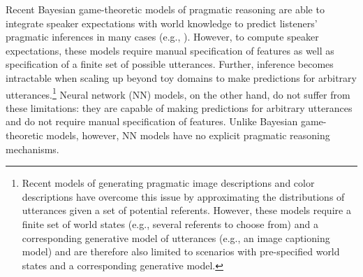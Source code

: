\documentclass[11pt,a4paper]{article}
\begin{document}
Recent Bayesian game-theoretic models of pragmatic reasoning \citep{goodman2016pragmatic,franke2016probabilistic} are able to integrate speaker expectations with world knowledge to predict listeners' pragmatic inferences in many cases (e.g., \citealt{goodman2013knowledge,degen2015wonky}). However, to compute speaker expectations, these models require manual specification of features as well as specification of a finite set of possible utterances. Further, inference becomes intractable when scaling up beyond toy domains to make predictions for arbitrary utterances.\footnote{Recent models of generating pragmatic image descriptions \citep{Andreas2016,CohnGordon2018} and color descriptions \citep{Monroe2017} have overcome this issue by approximating the distributions of utterances given a set of potential referents. However, these models require a finite set of world states (e.g., several referents to choose from) and a corresponding generative model of utterances (e.g., an image captioning model) and are therefore also limited to scenarios with pre-specified world states and a corresponding generative model.} Neural network (NN) models, on the other hand, do not suffer from these limitations: they are capable of making predictions for arbitrary utterances and do not require manual specification of features. Unlike Bayesian game-theoretic models, however, NN models have no explicit pragmatic reasoning mechanisms.
\end{document}
